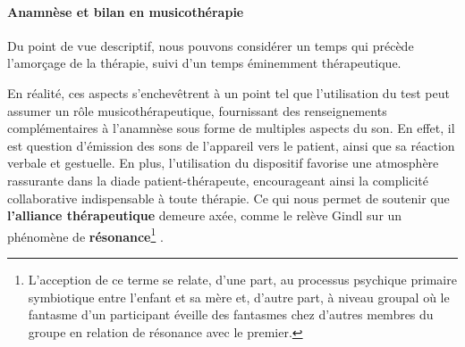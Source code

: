 

\paragraph{\textbf{Anamnèse et bilan en musicothérapie}}
Du point de vue descriptif, nous pouvons considérer un temps qui
précède
l'amorçage de la thérapie, suivi d'un temps éminemment thérapeutique.


En réalité, ces aspects s'enchevêtrent à un point tel que
l'utilisation du test peut assumer un rôle musicothérapeutique, fournissant des
  renseignements complémentaires à l'anamnèse sous forme de multiples
  aspects du son. En effet, il est  question d'émission des sons de
  l'appareil vers le patient, ainsi que sa réaction verbale et gestuelle.
En plus, l'utilisation
   du dispositif favorise une atmosphère rassurante dans la diade
   patient-thérapeute, encourageant ainsi la complicité collaborative
 indispensable à toute
 thérapie.
Ce qui nous permet de soutenir que
 \textbf{l'alliance thérapeutique} demeure axée, comme le relève Gindl
  \autocite{gindl} sur
 un phénomène de \textbf{résonance}\footnote{\autocite{doronparot} L'acception de ce terme se relate, d'une part, au processus psychique
primaire symbiotique entre l'enfant et sa mère et, d'autre part, à
niveau groupal où le fantasme d'un participant éveille des fantasmes chez d'autres membres du groupe en relation
de résonance  avec le premier.} \autocite{doronparot}.

